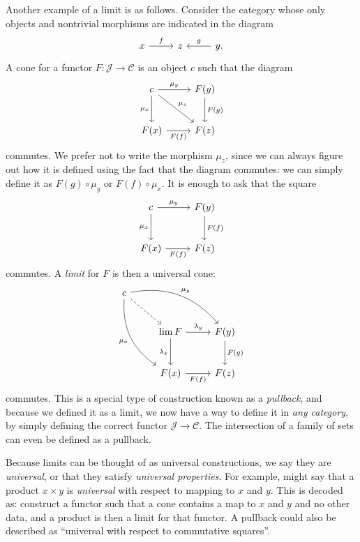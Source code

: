 \documentclass[11pt, A4]{article}
\begin{document}
	Another example of a limit is as follows. Consider the category whose only objects and nontrivial morphisms are indicated in the diagram
	\[\begin{tikzcd}[row sep = 2.5em, column sep = 2.5em]
	x \ar[" f ", r]  & z & y \ar[" g "', l] .
	\end{tikzcd}\]
	A cone for a functor $F : \mathcal{J}  \to \mathcal{C} $ is an object $c$ such that the diagram
	\[\begin{tikzcd}[row sep = 2.5em, column sep = 2.5em]
	c \ar[" \mu_y ", r] \ar[" \mu _z ", dr] \ar[" \mu _x "', d]  & F(y)\ar[" F(g) ", d]  \\
	F(x)\ar[" F(f) "', r]  & F(z)
	\end{tikzcd}\]
	commutes. We prefer not to write the morphism $\mu _z$, since we can always figure out how it is defined using the fact that the diagram commutes: we can simply define it as $F(g)\circ \mu _y$ or $F(f)\circ \mu _x$. It is enough to ask that the square
	\[\begin{tikzcd}[row sep = 2.5em, column sep = 2.5em]
	c \ar[" \mu _y ", r] \ar[" \mu _x "', d]  & F(y)\ar[" F(f) ", d]  \\
	F(x)\ar[" F(f) "', r]  & F(z)
	\end{tikzcd}\]
	commutes. A \emph{limit} for $F$ is then a universal cone:
	\[\begin{tikzcd}[row sep = 2.5em, column sep = 2.5em]
	c \ar[" \mu _y ", bend left, drr] \ar[" \mu _x "', bend right, ddr] \ar[dashed, dr]  &  &  \\
	 & \lim F \ar[" \lambda_y ", r] \ar[" \lambda _x "', d]  & F(y)\ar[" F(g) ", d]  \\
	 & F(x)\ar[" F(f) "', r]  & F(z)
	\end{tikzcd}\]
	commutes. This is a special type of construction known as a \emph{pullback}, and because we defined it as a limit, we now have a way to define it in \emph{any category}, by simply defining the correct functor $\mathcal{J} \to \mathcal{C} $. The intersection of a family of sets can even be defined as a pullback.

	Because limits can be thought of as universal constructions, we say they are \emph{universal}, or that they satisfy \emph{universal properties}. For example, might say that a product $x\times y$ is \emph{universal} with respect to mapping to $x$ and $y$. This is decoded as: construct a functor such that a cone contains a map to $x$ and $y$ and no other data, and a product is then a limit for that functor. A pullback could also be described as ``universal with respect to commutative squares''.
\end{document}
